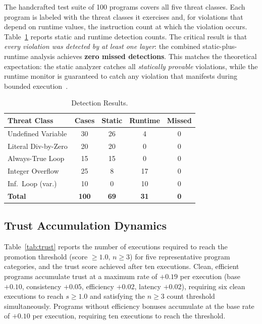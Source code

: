\documentclass[conference]{IEEEtran}
\begin{document}
The handcrafted test suite of 100 programs covers all five threat
classes. Each program is labeled with the threat classes it exercises
and, for violations that depend on runtime values, the instruction
count at which the violation occurs. Table~\ref{tab:detection}
reports static and runtime detection counts. The critical result is
that \emph{every violation was detected by at least one layer}:
the combined static-plus-runtime analysis achieves
\textbf{zero missed detections}. This matches the theoretical
expectation: the static analyzer catches all \emph{statically
provable} violations, while the runtime monitor is guaranteed to
catch any violation that manifests during bounded
execution~\cite{ami2024false_neg,huang2024static}.

\begin{table}[t]
\caption{Detection Results.}
\label{tab:detection}
\centering
\renewcommand{\arraystretch}{1.18}
\small
\begin{tabular}{@{} p{2.3cm} c c c c @{}}
\toprule
\textbf{Threat Class} & \textbf{Cases} &
\textbf{Static} & \textbf{Runtime} & \textbf{Missed} \\
\midrule
Undefined Variable   & 30 & 26 & 4  & 0 \\
Literal Div-by-Zero  & 20 & 20 & 0  & 0 \\
Always-True Loop     & 15 & 15 & 0  & 0 \\
Integer Overflow     & 25 &  8 & 17 & 0 \\
Inf.\ Loop (var.)    & 10 &  0 & 10 & 0 \\
\midrule
\textbf{Total}       & \textbf{100} & \textbf{69} &
\textbf{31} & \textbf{0} \\
\bottomrule
\end{tabular}
\end{table}

\subsection{Trust Accumulation Dynamics}

Table~\ref{tab:trust} reports the number of executions required
to reach the promotion threshold (score $\geq 1.0$, $n \geq 3$)
for five representative program categories, and the trust score
achieved after ten executions. Clean, efficient programs
accumulate trust at a maximum rate of $+0.19$ per execution
(base $+0.10$, consistency $+0.05$, efficiency $+0.02$,
latency $+0.02$), requiring six clean executions to reach
$s \geq 1.0$ and satisfying the $n \geq 3$ count threshold
simultaneously. Programs without efficiency bonuses accumulate
at the base rate of $+0.10$ per execution, requiring ten
executions to reach the threshold.
\end{document}

